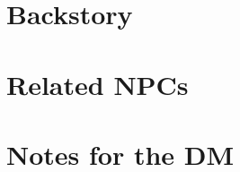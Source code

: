 \documentclass[12pt]{article}
\newif\iffull
\begin{document}

\iffull
  \section{Backstory}

  \section{Related NPCs}

  \section{Notes for the DM}
\end{document}
